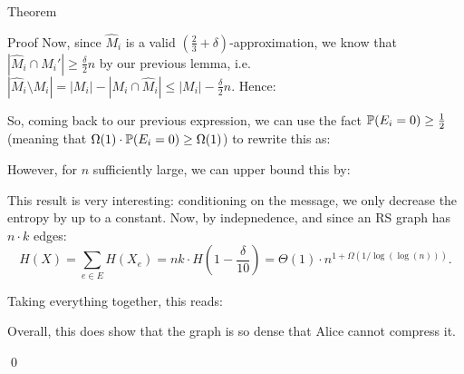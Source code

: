 \documentclass[a4paper]{article}
\begin{document}
\begin{parag}{Theorem}
\begin{subparag}{Proof}
        Now, since $\hat{M}_i$ is a valid $\left(\frac{2}{3} + \delta\right)$-approximation, we know that $\left|\hat{M}_i \cap M_i'\right| \geq \frac{\delta}{2} n$ by our previous lemma, i.e. $\left|\hat{M}_i \setminus M_i\right| = \left|M_i\right| - \left|M_i \cap \hat{M}_i\right| \leq \left|M_i\right| - \frac{\delta}{2}n$. Hence:

        So, coming back to our previous expression, we can use the fact $\prob\left(E_i = 0\right) \geq \frac{1}{2}$ (meaning that $\Omega\left(1\right)\cdot \prob\left(E_i = 0\right) \geq \Omega\left(1\right)$) to rewrite this as:

        However, for $n$ sufficiently large, we can upper bound this by:

        This result is very interesting: conditioning on the message, we only decrease the entropy by up to a constant. Now, by indepnedence, and since an RS graph has $n\cdot k$ edges: 
        \[H\left(X\right) = \sum_{e \in E} H\left(X_e\right) = nk\cdot H\left(1 - \frac{\delta}{10}\right) = \Theta\left(1\right)\cdot n^{1 + \Omega\left(1 / \log\left(\log\left(n\right)\right)\right)}.\]
        

        Taking everything together, this reads:

        Overall, this does show that the graph is so dense that Alice cannot compress it.
        
        \qed
    \end{subparag}
\end{parag}
\end{document}
